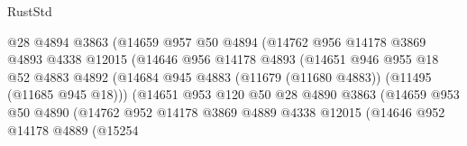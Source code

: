 \begin{lexlean}{RustStd}
\begin{coremodule}
                                  @28
                                  @4894
                                  @3863
                                  (@14659
                                    @957
                                    @50
                                    @4894
                                    (@14762
                                      @956
                                      @14178
                                      @3869
                                      @4893
                                      @4338
                                      @12015
                                      (@14646
                                        @956
                                        @14178
                                        @4893
                                        (@14651
                                          @946
                                          @955
                                          @18
                                          @52
                                          @4883
                                          @4892
                                          (@14684
                                            @945
                                            @4883
                                            (@11679 (@11680 @4883))
                                            (@11495 (@11685 @945 @18)))
                                          (@14651
                                            @953
                                            @120
                                            @50
                                            @28
                                            @4890
                                            @3863
                                            (@14659
                                              @953
                                              @50
                                              @4890
                                              (@14762
                                                @952
                                                @14178
                                                @3869
                                                @4889
                                                @4338
                                                @12015
                                                (@14646
                                                  @952
                                                  @14178
                                                  @4889
                                                  (@15254

\end{coremodule}
\end{lexlean}
